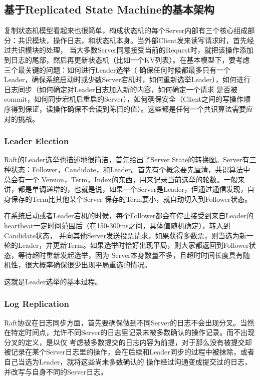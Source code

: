 \documentclass[UTF8]{article}
\begin{document}
\subsection{基于Replicated State Machine的基本架构}
复制状态机模型看起来也很简单，构成状态机的每个Server内部有三个核心组成部分：共识模块，操作日志，和状态机本身。当外部Client发来读写请求时，首先经过共识模块的处理，
当大多数Server同意接受当前的Request时，就把该操作添加到日志的尾部，然后再更新状态机（比如一个KV列表）。在基本模型下，要考虑三个最关键的问题：如何进行Leader选举（
确保任何时候都最多只有一个Leader，确保系统启动时或少数Server宕机时，如何重新选举Leader），如何进行日志同步（如何确定对Leader日志加入新的内容，如何确定一个请求
是否被commit，如何同步宕机后重启的Server），如何确保安全（Client之间的写操作顺序得到保证，读操作确保不会读到陈旧的值）。这些都是任何一个共识算法需要应对的挑战。

\subsubsection{Leader Election}
Raft的Leader选举也描述地很简洁，首先给出了Server State的转换图。Server有三种状态：Follower，Candidate，和Leader。首先有个概念要先厘清，共识算法中总会有一个
Version，Term，Index的东西，用来记录当前选举的轮数。一般来讲，都是单调递增的，也就是说，如果一个Server是Leader，但通过通信发现，自身保存的Term比其他某个Server
保存的Term要小，就自动切入到Follower状态。

在系统启动或者Leader宕机的时候，每个Follower都会在停止接受到来自Leader的heartbeat一定时间范围后（在150-300ms之间，具体值随机确定），转入到Candidate状态，
并向其他Server发送投票请求，如果获得多数票，则当选为新一轮的Leader，并更新Term。如果选举时恰好出现平局，则大家都返回到Follower状态，等待超时重新发起选举，因为
Server本身数量不多，且超时时间长度具有随机性，很大概率确保很少出现平局重选的情况。

这就是Leader选举的基本过程。

\subsubsection{Log Replication}
Raft协议在日志同步方面，首先要确保做到不同Server的日志不会出现分叉。当然在特定时间点，允许不同Server的日志里记录未被多数确认的操作记录。而不出现分叉的定义，是以仅
考虑被多数提交的日志内容为前提，对于那么没有被提交却被记录在某个Server日志里的操作，会在后续和Leader同步的过程中被抹除，或者自己当选为Leader，就将这些尚未多数确认的
操作经过沟通变成提交过的日志，并改写与自身不同的Server日志。
\end{document}
